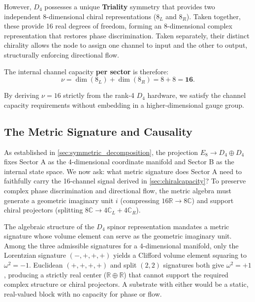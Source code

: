 However, $D_4$ possesses a unique \textbf{Triality} symmetry that provides two independent 8-dimensional chiral representations ($8_L$ and $8_R$). Taken together, these provide 16 real degrees of
freedom, forming an 8-dimensional complex representation that restores phase discrimination. Taken separately, their distinct chirality allows the node to assign one channel to input and the other to output, structurally enforcing directional flow.

The internal channel capacity \textbf{per sector} is therefore:
\begin{equation}
    \nu = \dim(8_L) + \dim(8_R) = 8 + 8 = \mathbf{16}.
\end{equation}

By deriving $\nu=16$ strictly from the rank-4 $D_4$ hardware, we satisfy the channel capacity requirements without embedding in a higher-dimensional gauge group.


\subsection{The Metric Signature and Causality}
\label{sec:metric_signature}
As established in \cref{sec:symmetric_decomposition}, the projection $E_8 \to D_4 \oplus D_4$ fixes Sector A as the 4-dimensional coordinate manifold and Sector B as the internal state space. We now ask: what metric signature does Sector A need to faithfully carry the 16-channel signal derived in \cref{sec:chiralcapacity}? To preserve complex phase discrimination and directional flow, the metric algebra must generate a geometric imaginary unit $i$ (compressing $16\mathbb{R} \to 8\mathbb{C}$) and support chiral projectors (splitting $8\mathbb{C} \to 4\mathbb{C}_L + 4\mathbb{C}_R$).

The algebraic structure of the $D_4$ spinor representation mandates a metric signature whose volume element can serve as the geometric imaginary unit. Among the three admissible signatures for a 4-dimensional manifold, only the Lorentzian signature $(-,+,+,+)$ yields a Clifford volume element squaring to $\omega^2 = -1$. Euclidean $(+,+,+,+)$ and split $(2,2)$ signatures both give $\omega^2 = +1$, producing a strictly real center ($\mathbb{R} \oplus \mathbb{R}$) that cannot support the required complex structure or chiral projectors. A substrate with either would be a static, real-valued block with no capacity for phase or flow.

